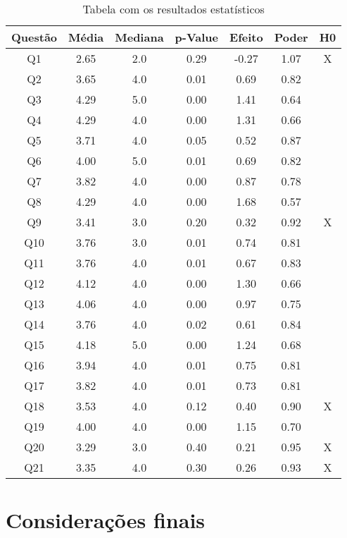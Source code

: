 \begin{table}[!ht]
    \centering
    \caption{Tabela com os resultados estatísticos}
    \label{tab:estatisticas}
    \footnotesize
    \begin{tabular}{|c|c|c|c|c|c|c|}
        \hline
        \cellcolor{green!25} \textbf{Questão} & \cellcolor{green!25} \textbf{Média} & \cellcolor{green!25} \textbf{Mediana} & \cellcolor{green!25} \textbf{p-Value} & \cellcolor{green!25} \textbf{Efeito} & \cellcolor{green!25} \textbf{Poder} & \cellcolor{green!25} \textbf{H0} \\
        \hline
        Q1 & 2.65 & 2.0 & 0.29 & -0.27 & 1.07 & X \\
        Q2 & 3.65 & 4.0 & 0.01 & 0.69 & 0.82 &  \\
        Q3 & 4.29 & 5.0 & 0.00 & 1.41 & 0.64 &  \\
        Q4 & 4.29 & 4.0 & 0.00 & 1.31 & 0.66 &  \\
        Q5 & 3.71 & 4.0 & 0.05 & 0.52 & 0.87 &  \\
        Q6 & 4.00 & 5.0 & 0.01 & 0.69 & 0.82 &  \\
        Q7 & 3.82 & 4.0 & 0.00 & 0.87 & 0.78 &  \\
        Q8 & 4.29 & 4.0 & 0.00 & 1.68 & 0.57 &  \\
        Q9 & 3.41 & 3.0 & 0.20 & 0.32 & 0.92 & X \\
        Q10 & 3.76 & 3.0 & 0.01 & 0.74 & 0.81 &  \\
        Q11 & 3.76 & 4.0 & 0.01 & 0.67 & 0.83 &  \\
        Q12 & 4.12 & 4.0 & 0.00 & 1.30 & 0.66 &  \\
        Q13 & 4.06 & 4.0 & 0.00 & 0.97 & 0.75 &  \\
        Q14 & 3.76 & 4.0 & 0.02 & 0.61 & 0.84 &  \\
        Q15 & 4.18 & 5.0 & 0.00 & 1.24 & 0.68 &  \\
        Q16 & 3.94 & 4.0 & 0.01 & 0.75 & 0.81 &  \\
        Q17 & 3.82 & 4.0 & 0.01 & 0.73 & 0.81 &  \\
        Q18 & 3.53 & 4.0 & 0.12 & 0.40 & 0.90 & X \\
        Q19 & 4.00 & 4.0 & 0.00 & 1.15 & 0.70 &  \\
        Q20 & 3.29 & 3.0 & 0.40 & 0.21 & 0.95 & X \\
        Q21 & 3.35 & 4.0 & 0.30 & 0.26 & 0.93 & X \\
        \hline
    \end{tabular}\normalsize
\end{table}



\section{Considerações finais}

